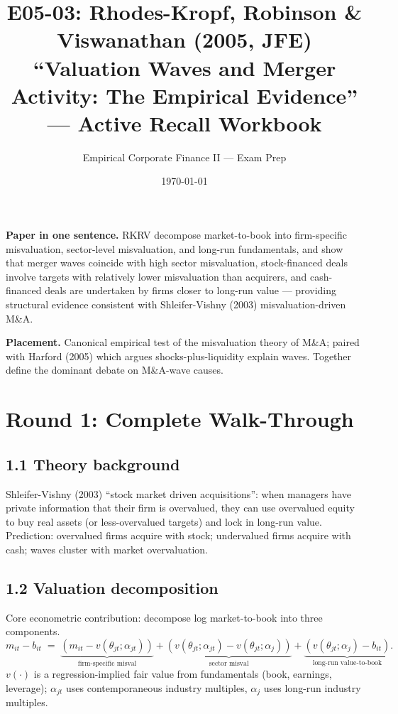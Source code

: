 \documentclass[11pt]{article}
\title{E05-03: Rhodes-Kropf, Robinson \& Viswanathan (2005, JFE) \\
\large ``Valuation Waves and Merger Activity: The Empirical Evidence'' --- Active Recall Workbook}
\author{Empirical Corporate Finance II --- Exam Prep}
\date{\today}
\begin{document}
\maketitle

\begin{keybox}
\textbf{Paper in one sentence.} RKRV decompose market-to-book into firm-specific misvaluation, sector-level misvaluation, and long-run fundamentals, and show that merger waves coincide with high sector misvaluation, stock-financed deals involve targets with relatively lower misvaluation than acquirers, and cash-financed deals are undertaken by firms closer to long-run value --- providing structural evidence consistent with Shleifer-Vishny (2003) misvaluation-driven M\&A.

\textbf{Placement.} Canonical empirical test of the misvaluation theory of M\&A; paired with Harford (2005) which argues shocks-plus-liquidity explain waves. Together define the dominant debate on M\&A-wave causes.
\end{keybox}

\section*{Round 1: Complete Walk-Through}

\subsection*{1.1 Theory background}
Shleifer-Vishny (2003) ``stock market driven acquisitions'': when managers have private information that their firm is overvalued, they can use overvalued equity to buy real assets (or less-overvalued targets) and lock in long-run value. Prediction: overvalued firms acquire with stock; undervalued firms acquire with cash; waves cluster with market overvaluation.

\subsection*{1.2 Valuation decomposition}
Core econometric contribution: decompose log market-to-book into three components.
\[
m_{it}-b_{it} \;=\; \underbrace{(m_{it}-v(\theta_{jt};\alpha_{jt}))}_{\text{firm-specific misval}}+\underbrace{(v(\theta_{jt};\alpha_{jt})-v(\theta_{jt};\alpha_j))}_{\text{sector misval}}+\underbrace{(v(\theta_{jt};\alpha_j)-b_{it})}_{\text{long-run value-to-book}}.
\]
$v(\cdot)$ is a regression-implied fair value from fundamentals (book, earnings, leverage); $\alpha_{jt}$ uses contemporaneous industry multiples, $\alpha_j$ uses long-run industry multiples.
\end{document}
